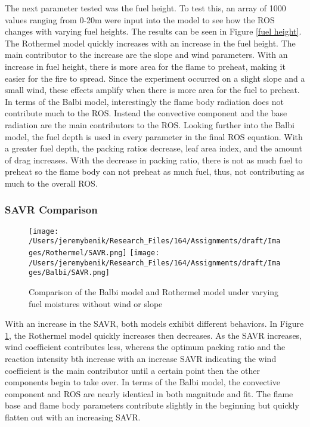 \documentclass{article}
\begin{document}
\indent The next parameter tested was the fuel height. To test this, an array of 1000 values ranging from 0-20m were input into the model to see how the ROS changes with varying fuel heights. The results can be seen in Figure \ref{fuel height}. The Rothermel model quickly increases with an increase in the fuel height. The main contributor to the increase are the slope and wind parameters. With an increase in fuel height, there is more area for the flame to preheat, making it easier for the fire to spread. Since the experiment occurred on a slight slope and a small wind, these effects amplify when there is more area for the fuel to preheat. In terms of the Balbi model, interestingly the flame body radiation does not contribute much to the ROS. Instead the convective component and the base radiation are the main contributors to the ROS. Looking further into the Balbi model, the fuel depth is used in every parameter in the final ROS equation. With a greater fuel depth, the packing ratios decrease, leaf area index, and the amount of drag increases. With the decrease in packing ratio, there is not as much fuel to preheat so the flame body can not preheat as much fuel, thus, not contributing as much to the overall ROS.
\subsubsection{SAVR Comparison}
\begin{figure}
\centering
  \texttt{[image: /Users/jeremybenik/Research\_Files/164/Assignments/draft/Images/Rothermel/SAVR.png]}
  \texttt{[image: /Users/jeremybenik/Research\_Files/164/Assignments/draft/Images/Balbi/SAVR.png]}
  \caption{Comparison of the Balbi model and Rothermel model under varying fuel moistures without wind or slope}
  \label{SAVR}
\end{figure}
\indent With an increase in the SAVR, both models exhibit different behaviors. In Figure \ref{SAVR}, the Rothermel model quickly increases then decreases. As the SAVR increases, wind coefficient contributes less, whereas the optimum packing ratio and the reaction intensity bth increase with an increase SAVR indicating the wind coefficient is the main contributor until a certain point then the other components begin to take over. In terms of the Balbi model, the convective component and ROS are nearly identical in both magnitude and fit. The flame base and flame body parameters contribute slightly in the beginning but quickly flatten out with an increasing SAVR.
\end{document}
